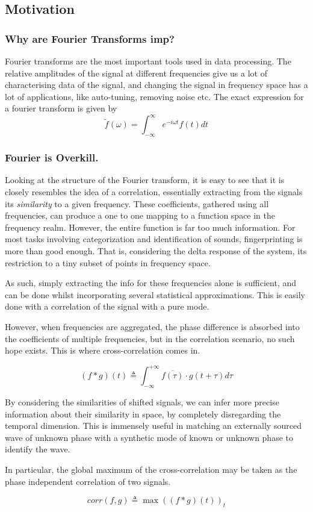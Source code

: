 \subsection{Motivation}

\subsubsection{Why are Fourier Transforms imp?} Fourier transforms are the most important tools used in data processing. The relative amplitudes of the signal at different frequencies give us a lot of characterising data of the signal, and changing the signal in frequency space has a lot of applications, like auto-tuning, removing noise etc. The exact expression for a fourier transform is given by 
\begin{equation}
    \tilde{f}(\omega) = \int_{-\infty}^{\infty} e^{-i\omega t}f(t)dt
\end{equation}


\subsubsection{Fourier is Overkill.}
Looking at the structure of the Fourier transform, it is easy to see that it is
closely resembles the idea of a correlation, essentially extracting from the
signals its \emph{similarity} to a given frequency. These coefficients, gathered
using all frequencies, can produce a one to one mapping to a function space in
the frequency realm. However, the entire function is far too much information.
For most tasks involving categorization and identification of sounds,
fingerprinting is more than good enough. That is, considering the delta response
of the system, its restriction to a tiny subset of points in frequency space.

As such, simply extracting the info for these frequencies alone is sufficient,
and can be done whilst incorporating several statistical approximations. This is
easily done with a correlation of the signal with a pure mode. 

However, when frequencies are aggregated, the phase difference is absorbed into
the coefficients of multiple frequencies, but in the correlation scenario, no
such hope exists. This is where cross-correlation comes in. 

\begin{equation}
    (f \ast g)(t) \triangleq \int_{-\infty}^{+\infty} \overline{f(\tau)} \cdot g(t+\tau) d\tau
\end{equation}

By considering the similarities of shifted signals, we can infer more precise
information about their similarity in space, by completely disregarding the
temporal dimension. This is immensely useful in matching an externally sourced
wave of unknown phase with a synthetic mode of known or unknown phase to
identify the wave.

In particular, the global maximum of the cross-correlation may be taken as the
phase independent correlation of two signals.

\begin{equation}
    corr(f, g) \triangleq \max((f \ast g) (t))_t
\end{equation}
